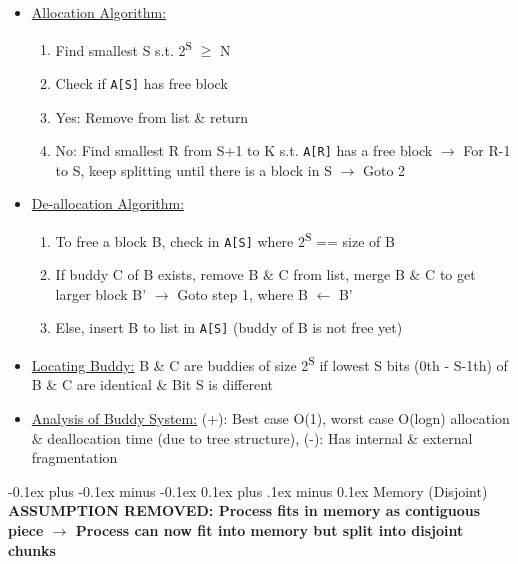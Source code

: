 \documentclass[landscape]{article}
\makeatletter
\renewcommand{\section}{\@startsection{section}{1}{0mm}%
  {-0.1ex plus -0.1ex minus -0.1ex}%
  {0.1ex plus .1ex minus 0.1ex}%
{\normalfont\small\bfseries}}
\makeatother
\begin{document}
\begin{multicols*}{6}
\begin{itemize}
\begin{itemize}
        \item \underline{Allocation Algorithm:}
        \begin{enumerate}
          \item Find smallest S s.t. 2\textsuperscript{S} $\geq$ N 
          \item Check if \verb|A[S]| has free block
          \item Yes: Remove from list \& return
          \item No: Find smallest R from S+1 to K s.t. \verb|A[R]| has a free block $\rightarrow$ For R-1 to S, keep splitting until there is a block in S $\rightarrow$ Goto 2
        \end{enumerate}
        \item \underline{De-allocation Algorithm:}
        \begin{enumerate}
          \item To free a block B, check in \verb|A[S]| where 2\textsuperscript{S} == size of B
          \item If buddy C of B exists, remove B \& C from list, merge B \& C to get larger block B' $\rightarrow$ Goto step 1, where B $\leftarrow$ B'
          \item Else, insert B to list in \verb|A[S]| (buddy of B is not free yet)
        \end{enumerate}
        \item \underline{Locating Buddy:} B \& C are buddies of size 2\textsuperscript{S} if lowest S bits (0th - S-1th) of B \& C are identical \& Bit S is different
        \item \underline{Analysis of Buddy System:} (+): Best case O(1), worst case O(logn) allocation \& deallocation time (due to tree structure), (-): Has internal \& external fragmentation
      \end{itemize}
    \end{itemize}

    \section{Memory (Disjoint)}
    \textbf{ASSUMPTION REMOVED: Process fits in memory as contiguous piece $\rightarrow$ Process can now fit into memory but split into disjoint chunks}

\end{multicols*}
\end{document}
